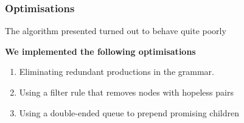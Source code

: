 \documentclass[10pt]{beamer}
\begin{document}
  



\begin{frame}
  \frametitle{Optimisations}
  The algorithm presented turned out to behave quite poorly
  
  \textbf{We implemented the following optimisations}
  \begin{enumerate}
  \item Eliminating redundant productions in the grammar.
  \item Using a filter rule that removes nodes with hopeless pairs
  \item Using a double-ended queue to prepend promising children
  \end{enumerate}
\end{frame}
\end{document}
